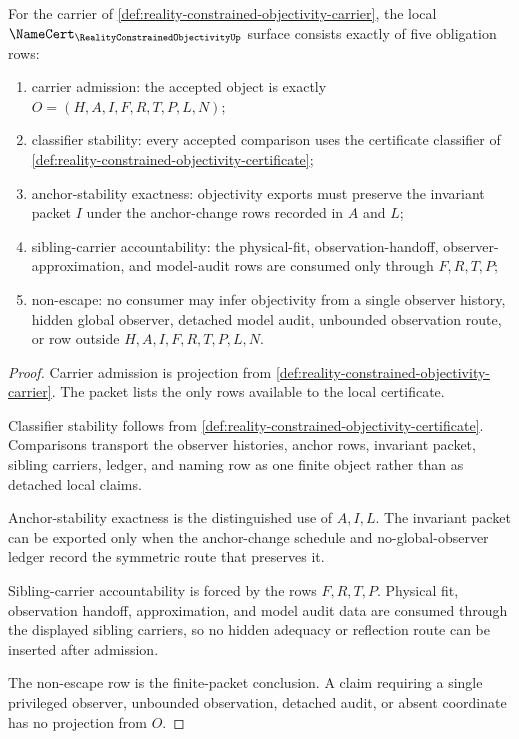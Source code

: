 \begin{theorem}
\label{thm:reality-constrained-objectivity-namecert-obligations}
For the carrier of \autoref{def:reality-constrained-objectivity-carrier}, the local $\NameCert_{\RealityConstrainedObjectivityUp}$ surface consists exactly of five obligation rows:
\begin{enumerate}
\item carrier admission: the accepted object is exactly $O=(H,A,I,F,R,T,P,L,N)$;
\item classifier stability: every accepted comparison uses the certificate classifier of \autoref{def:reality-constrained-objectivity-certificate};
\item anchor-stability exactness: objectivity exports must preserve the invariant packet $I$ under the anchor-change rows recorded in $A$ and $L$;
\item sibling-carrier accountability: the physical-fit, observation-handoff, observer-approximation, and model-audit rows are consumed only through $F,R,T,P$;
\item non-escape: no consumer may infer objectivity from a single observer history, hidden global observer, detached model audit, unbounded observation route, or row outside $H,A,I,F,R,T,P,L,N$.
\end{enumerate}
\end{theorem}
\begin{proof}
Carrier admission is projection from \autoref{def:reality-constrained-objectivity-carrier}. The packet lists the only rows available to the local certificate.

Classifier stability follows from \autoref{def:reality-constrained-objectivity-certificate}. Comparisons transport the observer histories, anchor rows, invariant packet, sibling carriers, ledger, and naming row as one finite object rather than as detached local claims.

Anchor-stability exactness is the distinguished use of $A,I,L$. The invariant packet can be exported only when the anchor-change schedule and no-global-observer ledger record the symmetric route that preserves it.

Sibling-carrier accountability is forced by the rows $F,R,T,P$. Physical fit, observation handoff, approximation, and model audit data are consumed through the displayed sibling carriers, so no hidden adequacy or reflection route can be inserted after admission.

The non-escape row is the finite-packet conclusion. A claim requiring a single privileged observer, unbounded observation, detached audit, or absent coordinate has no projection from $O$.
\end{proof}

